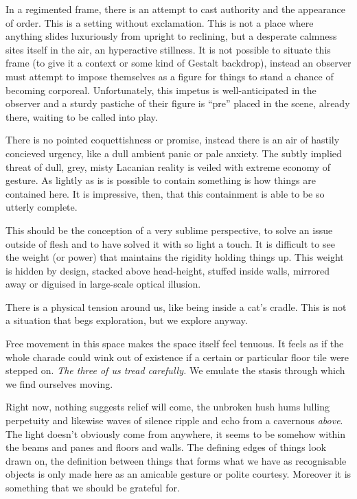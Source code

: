\documentclass{book}
\begin{document}
In a regimented frame, there is an attempt to cast authority and the appearance
of order. This is a setting without exclamation. This is not a place where
anything slides luxuriously from upright to reclining, but a desperate calmness
sites itself in the air, an hyperactive stillness. It is not possible to
situate this frame (to give it a context or some kind of Gestalt backdrop),
instead an observer must attempt to impose themselves as a figure for things to
stand a chance of becoming corporeal. Unfortunately, this impetus is
well-anticipated in the observer and a sturdy pastiche of their figure is
``pre'' placed in the scene, already there, waiting to be called into play.

There is no pointed coquettishness or promise, instead there is an air of
hastily concieved urgency, like a dull ambient panic or pale anxiety. The
subtly implied threat of dull, grey, misty Lacanian reality is veiled with
extreme economy of gesture. As lightly as is is possible to contain something
is how things are contained here. It is impressive, then, that this
containment is able to be so utterly complete.

This should be the conception of a very sublime perspective, to solve an issue
outside of flesh and to have solved it with so light a touch. It is difficult
to see the weight (or power) that maintains the rigidity holding things up.
This weight is hidden by design, stacked above head-height, stuffed inside
walls, mirrored away or diguised in large-scale optical illusion.

There is a physical tension around us, like being inside a cat's cradle. This
is not a situation that begs exploration, but we explore anyway.

Free movement in this space makes the space itself feel tenuous. It feels as if
the whole charade could wink out of existence if a certain or particular floor
tile were stepped on.  \emph{The three of us tread carefully.} We emulate the
stasis through which we find ourselves moving.

Right now, nothing suggests relief will come, the unbroken hush hums lulling
perpetuity and likewise waves of silence ripple and echo from a cavernous
\emph{above}.  The light doesn't obviously come from anywhere, it seems to be
somehow within the beams and panes and floors and walls. The defining edges of
things look drawn on, the definition between things that forms what we have as
recognisable objects is only made here as an amicable gesture or polite
courtesy. Moreover it is something that we should be grateful for.
\end{document}
